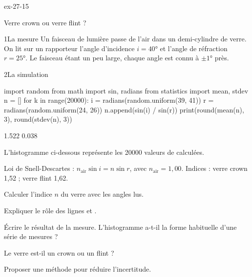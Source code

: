 \begin{blocLivre}{ex-27-15}
\begin{exercice}[3]{Verre crown ou verre flint ?}
\begin{docu}{1}{La mesure}
Un faisceau de lumière passe de l'air dans un demi-cylindre de verre. On lit sur un rapporteur l'angle d'incidence
$i=\ang{40}$ et l'angle de réfraction $r=\ang{25}$. Le faisceau étant un peu large, chaque angle est connu à $\pm\ang{1}$ près.
\end{docu}
\begin{docu}{2}{La simulation}
\begin{codecote}[0.66]
\begin{pythoncol}
import random
from math import sin, radians
from statistics import mean, stdev
n = []
for k in range(20000):
    i = radians(random.uniform(39, 41))
    r = radians(random.uniform(24, 26))
    n.append(sin(i) / sin(r))
print(round(mean(n), 3), round(stdev(n), 3))
\end{pythoncol}
\cote
\begin{consolecol}
1.522 0.038
\end{consolecol}
\par\medskip
\fontsize{9.5}{12.5}\selectfont
L'histogramme ci-dessous représente les \num{20000} valeurs de  calculées.
\end{codecote}
\end{docu}
\begin{donnees}
Loi de Snell-Descartes : $n_\mathrm{air}\sin i=n\sin r$, avec $n_\mathrm{air}=1{,}00$. Indices : verre crown 1,52 ; verre flint 1,62.
\end{donnees}
\begin{questions}
\item Calculer l'indice $n$ du verre avec les angles lus.
\item {}Expliquer le rôle des lignes  et .
\item Écrire le résultat de la mesure. L'histogramme a-t-il la forme habituelle d'une série de mesures ?
\item \initiative Le verre est-il un crown ou un flint ?
\item Proposer une méthode pour réduire l'incertitude.
\end{questions}
\end{exercice}
\end{blocLivre}
